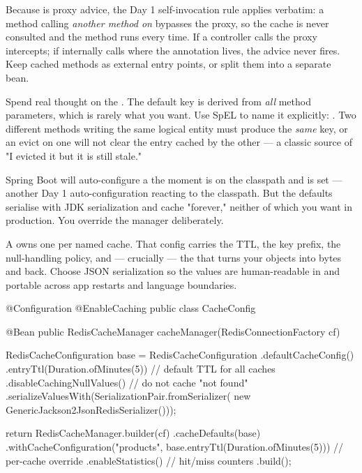 \begin{secwarn}
Because  is proxy advice, the Day 1 self-invocation rule applies verbatim: a method calling \emph{another  method on } bypasses the proxy, so the cache is never consulted and the method runs every time. If a controller calls  the proxy intercepts; if  internally calls  where the annotation lives, the advice never fires. Keep cached methods as external entry points, or split them into a separate bean.
\end{secwarn}

\begin{prodtip}
Spend real thought on the . The default key is derived from \emph{all} method parameters, which is rarely what you want. Use SpEL to name it explicitly: . Two different methods writing the same logical entity must produce the \emph{same} key, or an evict on one will not clear the entry cached by the other --- a classic source of "I evicted it but it is still stale."
\end{prodtip}


 Spring Boot will auto-configure a  the moment  is on the classpath and  is set --- another Day 1 auto-configuration reacting to the classpath. But the defaults serialise with JDK serialization and cache "forever," neither of which you want in production. You override the manager deliberately.

 A  owns one  per named cache. That config carries the TTL, the key prefix, the null-handling policy, and --- crucially --- the  that turns your objects into bytes and back. Choose JSON serialization so the values are human-readable in  and portable across app restarts and language boundaries.

\begin{javabox}
@Configuration
@EnableCaching
public class CacheConfig {

  @Bean
  public RedisCacheManager cacheManager(RedisConnectionFactory cf) {
    RedisCacheConfiguration base = RedisCacheConfiguration
        .defaultCacheConfig()
        .entryTtl(Duration.ofMinutes(5))       // default TTL for all caches
        .disableCachingNullValues()            // do not cache "not found"
        .serializeValuesWith(SerializationPair.fromSerializer(
            new GenericJackson2JsonRedisSerializer()));

    return RedisCacheManager.builder(cf)
        .cacheDefaults(base)
        .withCacheConfiguration("products",
            base.entryTtl(Duration.ofMinutes(5)))   // per-cache override
        .enableStatistics()                          // hit/miss counters
        .build();
  }
}
\end{javabox}

